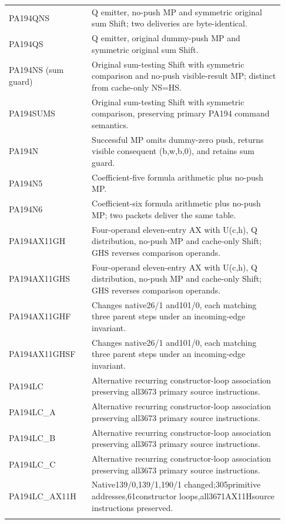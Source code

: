 \begin{longtable}{>{\raggedright\arraybackslash}p{0.28\linewidth}>{\raggedright\arraybackslash}p{0.65\linewidth}}
PA194QNS & Q emitter, no-push MP and symmetric original sum Shift; two deliveries are byte-identical.\\\addlinespace[4pt]
PA194QS & Q emitter, original dummy-push MP and symmetric original sum Shift.\\\addlinespace[4pt]
PA194NS (sum guard) & Original sum-testing Shift with symmetric comparison and no-push visible-result MP; distinct from cache-only NS=HS.\\\addlinespace[4pt]
PA194SUMS & Original sum-testing Shift with symmetric comparison, preserving primary PA194 command semantics.\\\addlinespace[4pt]
PA194N & Successful MP omits dummy-zero push, returns visible consequent (b,w,b,0), and retains sum guard.\\\addlinespace[4pt]
PA194N5 & Coefficient-five formula arithmetic plus no-push MP.\\\addlinespace[4pt]
PA194N6 & Coefficient-six formula arithmetic plus no-push MP; two packets deliver the same table.\\\addlinespace[4pt]
PA194AX11GH & Four-operand eleven-entry AX with U(c,h), Q distribution, no-push MP and cache-only Shift; GHS reverses comparison operands.\\\addlinespace[4pt]
PA194AX11GHS & Four-operand eleven-entry AX with U(c,h), Q distribution, no-push MP and cache-only Shift; GHS reverses comparison operands.\\\addlinespace[4pt]
PA194AX11GHF & Changes native26/\allowbreak{}1 and101/\allowbreak{}0, each matching three parent steps under an incoming-edge invariant.\\\addlinespace[4pt]
PA194AX11GHSF & Changes native26/\allowbreak{}1 and101/\allowbreak{}0, each matching three parent steps under an incoming-edge invariant.\\\addlinespace[4pt]
PA194LC & Alternative recurring constructor-loop association preserving all3673 primary source instructions.\\\addlinespace[4pt]
PA194LC\_A & Alternative recurring constructor-loop association preserving all3673 primary source instructions.\\\addlinespace[4pt]
PA194LC\_B & Alternative recurring constructor-loop association preserving all3673 primary source instructions.\\\addlinespace[4pt]
PA194LC\_C & Alternative recurring constructor-loop association preserving all3673 primary source instructions.\\\addlinespace[4pt]
PA194LC\_AX11H & Native139/\allowbreak{}0,139/\allowbreak{}1,190/\allowbreak{}1 changed;305primitive addresses,61constructor loops,all3671AX11Hsource instructions preserved.\\\addlinespace[4pt]

\end{longtable}
